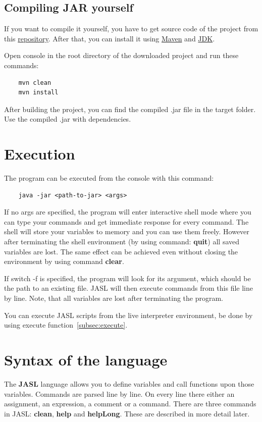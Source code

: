 \documentclass{ctuthesis}
\begin{document}
\subsection{Compiling JAR yourself}
If you want to compile it yourself, you have to get source code of the project from this \href{https://github.com/horovtom/jautomata}{repository}. After that, you can install it using \href{https://maven.apache.org/}{Maven} and \href{https://www.oracle.com/technetwork/java/javase/downloads/jdk8-downloads-2133151.html}{JDK}. 

Open console in the root directory of the downloaded project and run these commands:
\begin{verbatim}
	mvn clean
	mvn install
\end{verbatim}

After building the project, you can find the compiled .jar file in the target folder. Use the compiled .jar with dependencies.

\section{Execution}
\label{sec:execution}
The program can be executed from the console with this command:

\begin{verbatim}
	java -jar <path-to-jar> <args>
\end{verbatim}

If no args are specified, the program will enter interactive shell mode where you can type your commands and get immediate response for every command. The shell will store your variables to memory and you can use them freely. However after terminating the shell environment (by using command: \textbf{quit}) all saved variables are lost. The same effect can be achieved even without closing the environment by using command \textbf{clear}. 

If switch -f is specified, the program will look for its argument, which should be the path to an existing file. JASL will then execute commands from this file line by line. Note, that all variables are lost after terminating the program. 

You can execute JASL scripts from the live interpreter environment, be done by using execute function~\ref{subsec:execute}. 

\section{Syntax of the language}
\label{subsec:syntax}
The \textbf{JASL} language allows you to define variables and call functions upon those variables. Commands are parsed line by line. On every line there either an assignment, an expression, a comment or a command. There are three commands in JASL: \textbf{clean}, \textbf{help} and \textbf{helpLong}. These are described in more detail later.
\end{document}
